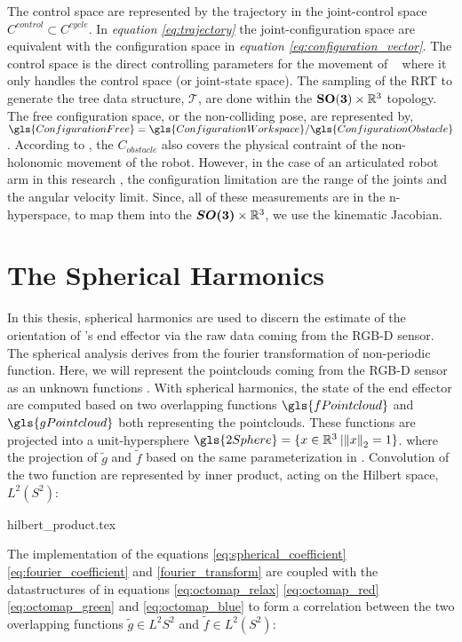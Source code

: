 The control space are represented by the trajectory in the joint-control
space $C^{control} \subset C^{cycle}$. In \textit{equation \ref{eq:trajectory}} the
joint-configuration space are equivalent with the configuration space in 
\textit{equation \ref{eq:configuration_vector}}. 
The control space
is the direct controlling parameters for the movement of 
\rimini~ where it
only handles the control space (or joint-state space).
The sampling of the RRT to generate the tree data structure, $\mathcal{T}$,
are done within the $\vb{SO(3)} \times \mathbb{R}^3$ topology. The free
configuration space, or the non-colliding pose, are represented by, 
$\gls{ConfigurationFree} = \gls{ConfigurationWorkspace} / \gls{ConfigurationObstacle}$. 
According to 
\textcite{LaValle1998}, the $C_{obstacle}$ also covers 
the physical contraint of the non-holonomic movement of the robot. 
However, in the case of an articulated robot arm in this research
, the configuration 
limitation are the range of the joints and the angular velocity limit. 
Since, all of these
measurements are in the n-hyperspace, to map them into the
$\vb*{SO(3)} \times \mathbb{R}^3$, we use the kinematic Jacobian.

\section{The Spherical Harmonics}\label{sec:spherical_harmonics}
In this thesis, spherical harmonics are used to discern the 
estimate of the orientation of \rimini's end effector via the 
raw data coming from the RGB-D sensor. The spherical analysis derives from 
the fourier transformation of non-periodic function. Here, 
we will represent the pointclouds coming from the RGB-D sensor 
as an unknown functions \parencite{Osteen2012}. With spherical harmonics, the state of the 
end effector are computed based on two overlapping functions $\gls{fPointcloud}$
and $\gls{gPointcloud}$ both representing the pointclouds. These functions
are projected into a unit-hypersphere $\gls{2Sphere} =\{x \in \mathbb{R}^3\: | {\Vert x \Vert}_2 = 1\}$.
where the projection of $\tilde{g}$ and $\tilde{f}$ based on the
same parameterization in \textcite{Healy2003}. Convolution of the two function 
are represented by inner product, acting on the Hilbert space, $L^2(S^2)$:

{hilbert_product.tex}

The implementation of the equations \ref{eq:spherical_coefficient} 
\ref{eq:fourier_coefficient} and \ref{fourier_transform} are coupled
with the datastructures of in equations \ref{eq:octomap_relax} \ref{eq:octomap_red} 
\ref{eq:octomap_green} and \ref{eq:octomap_blue}
to form a correlation between the two overlapping functions $\tilde{g} \in L^2{S^2}$ and 
$\tilde{f} \in L^2(S^2)$: 

